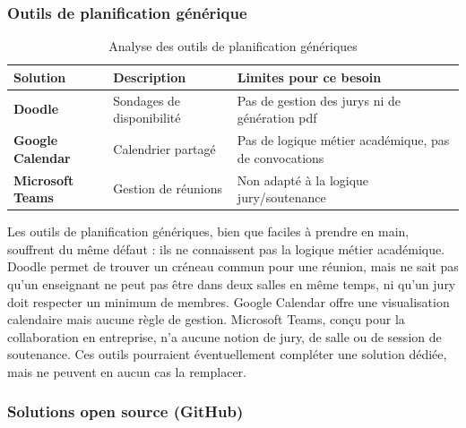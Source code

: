 \subsubsection{Outils de planification générique}
\label{ch2:planification_generique}

\begin{table}[H]
    \centering
    \small
    \begin{xltabular}{\textwidth}{lXX}
        \toprule

        \textbf{Solution}        & \textbf{Description}      & \textbf{Limites pour ce besoin}                       \\
        \midrule
        \textbf{Doodle}          & Sondages de disponibilité & Pas de gestion des jurys ni de génération \acrshort{pdf}         \\
        \addlinespace
        \textbf{Google Calendar} & Calendrier partagé        & Pas de logique métier académique, pas de convocations \\
        \addlinespace
        \textbf{Microsoft Teams} & Gestion de réunions       & Non adapté à la logique jury/soutenance               \\
        \bottomrule
    \end{xltabular}
    \caption{Analyse des outils de planification génériques}
    \label{tab:planification_generique}
\end{table}

Les outils de planification génériques, bien que faciles à prendre en main, souffrent du même défaut : ils ne connaissent pas la logique métier académique. Doodle permet de trouver un créneau commun pour une réunion, mais ne sait pas qu'un enseignant ne peut pas être dans deux salles en même temps, ni qu'un jury doit respecter un minimum de membres. Google Calendar offre une visualisation calendaire mais aucune règle de gestion. Microsoft Teams, conçu pour la collaboration en entreprise, n'a aucune notion de jury, de salle ou de session de soutenance. Ces outils pourraient éventuellement compléter une solution dédiée, mais ne peuvent en aucun cas la remplacer.

\subsubsection{Solutions open source (GitHub)}
\label{ch2:opensource}

